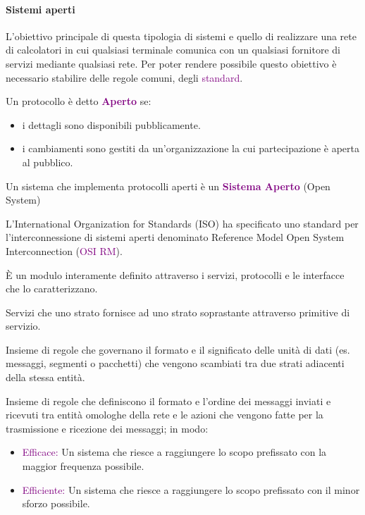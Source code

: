 \paragraph{Sistemi aperti} L'obiettivo principale di questa tipologia di sistemi e quello di realizzare una rete di calcolatori in cui qualsiasi terminale comunica con un qualsiasi fornitore di servizi mediante qualsiasi rete. \newline Per poter rendere possibile questo obiettivo è necessario stabilire delle regole comuni, degli \textcolor{purple}{standard}.

\begin{definition}
    Un protocollo è detto \textbf{\textcolor{purple}{Aperto}} se:
    \begin{itemize}
        \item i dettagli sono disponibili pubblicamente.
        \item i cambiamenti sono gestiti da un'organizzazione la cui partecipazione è aperta al pubblico.
    \end{itemize}
\end{definition}
\begin{definition}
    Un sistema che implementa protocolli aperti è un \textbf{\textcolor{purple}{Sistema Aperto}} (Open System)
\end{definition}

L’International Organization for Standards (ISO) ha specificato uno standard per l’interconnessione di sistemi aperti denominato Reference Model Open System Interconnection (\textcolor{purple}{OSI RM}).

\begin{definition}[Strato] 
    È un modulo interamente definito attraverso i servizi, protocolli e le interfacce che lo caratterizzano.
\end{definition}
\begin{definition}[Servizio]
    Servizi che uno strato fornisce ad uno strato soprastante attraverso primitive di servizio.
\end{definition}
\begin{definition}[Interfaccia]
    Insieme di regole che governano il formato e il significato delle unità di dati (es. messaggi, segmenti o pacchetti) che vengono scambiati tra due strati adiacenti della stessa entità.
\end{definition}
\begin{definition}[Protocollo]
    Insieme di regole che definiscono il formato e l’ordine dei messaggi inviati e ricevuti tra entità omologhe della rete e le azioni che vengono fatte per la trasmissione e ricezione dei messaggi; in modo:
    \begin{itemize}
        \item \textcolor{purple}{Efficace:} Un sistema che riesce a raggiungere lo scopo prefissato con la maggior frequenza possibile.
        \item \textcolor{purple}{Efficiente:} Un sistema che riesce a raggiungere lo scopo prefissato con il minor sforzo possibile.
    \end{itemize}
    
\end{definition}

